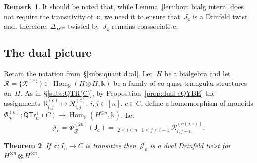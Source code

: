 \documentclass[12pt, reqno]{amsart}
\newcommand{\sfR}{\mathsf{R}}
\newtheorem{theorem}{Theorem}[section]
\theoremstyle{definition}
\newtheorem{remark}[theorem]{Remark}
\newcommand{\ascprodst}{\mathop{\overrightarrow{\prod}^\ast}}
\newcommand{\dscprodst}{\mathop{\overleftarrow{\prod}^\ast}}
\numberwithin{equation}{section}
\newcommand{\tensor}{\otimes}
\newcommand{\kk}{\mathbb{k}}\newcommand{\lie}[1]{{\mathfrak{#1}}}
\DeclareMathOperator{\Hom}{Hom}
\begin{document}
\begin{remark}
It should be noted that, while Lemma~\ref{lem:hom bialg intern} does not require the transitivity of~$\mathbf c$, we need it to ensure that~$J_{\mathbf c}$ is a Drinfeld twist and,
therefore, $\Delta_{H^{\tensor n}}$ twisted by~$J_{\mathbf c}$ remains coassociative.
\end{remark}

\subsection{The dual picture}\label{subs:dual Jc}
Retain the notation from~\S\ref{subs:quant dual}.
Let~$H$ be a bialgebra and let~$\underline{\mathcal R}=\{\mathcal R^{(c)}\}\subset \Hom_\kk(H\tensor H,\kk)$ be a family of co-quasi-triangular structures on~$H$. As in~\S\ref{subs:QTR(C)}, by Proposition~\ref{prop:dual cQYBE}
the assignments~$\sfR_{i,j}^{(c)}\mapsto \mathcal R_{i,j}^{(c)}$, $i,j\in[n]$, $c\in C$, define a homomorphism of monoids
$\Phi^{(n)}_{\underline{\mathcal R}}:\mathsf{QTr}^+_n(C)\to \Hom_\kk(H^{\tensor n},\kk)$.
Let
\begin{equation}\label{eq:Jc dual product}
\mathcal J_{\mathbf c}=\Phi^{(2n)}_{\underline{\mathcal R}}(\mathsf J_{\mathbf c})=\ascprodst_{2\le i\le n}
\dscprodst_{1\le j\le i-1} \mathcal R_{i,j+n}^{(\mathbf c(j,i))}. 
\end{equation}
\begin{theorem}\label{thm:dual Jc twist}
If~$\mathbf c:I_n\to C$ is transitive then~${\mathcal J}_{\mathbf c}$ is a dual Drinfeld twist
for~$H^{\tensor n}\tensor H^{\tensor n}$.
\end{theorem}
\end{document}
